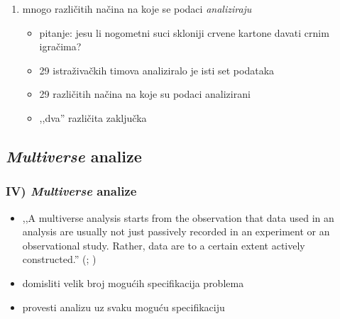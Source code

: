 \documentclass{beamer}
\newcounter{saveenumi}
\newcommand{\conti}{\setcounter{enumi}{\value{saveenumi}}}
\newcommand{\tinycitep}[1]{%
    \bgroup
    \scriptsize
    \citep{#1}
    \egroup}
\begin{document}
\begin{frame}
    \begin{enumerate}
        \conti

        \item mnogo različitih načina na koje se podaci \emph{analiziraju}
            \tinycitep{silberzahnManyAnalystsOne2018}

            \begin{itemize}
                \item pitanje: jesu li nogometni suci skloniji crvene kartone
                    davati crnim igračima?

                \pause

                \item 29 istraživačkih timova analiziralo je isti set
                    podataka

                \pause

                \item 29 različitih načina na koje su podaci analizirani

                \pause

                \item ,,dva'' različita zaključka
            \end{itemize}

    \end{enumerate}
\end{frame}

\subsection{\textit{Multiverse} analize}

\begin{frame}
    \frametitle{IV) \textit{Multiverse} analize}

    \begin{itemize}
        \item ,,A multiverse analysis starts from the observation that data used
            in an analysis are usually not just passively recorded in an
            experiment or an observational study.  Rather, data are to a certain
            extent actively constructed.''
            \bgroup
            \scriptsize
            (\citealp*[str. 702]{steegenIncreasingTransparencyMultiverse2016};
            \citealp*[za sličan pristup
            vidi][]{simonsohnSpecificationCurveDescriptive2015})
            \egroup

        \pause

        \item domisliti velik broj mogućih specifikacija problema

        \item provesti analizu uz svaku moguću specifikaciju

    \end{itemize}

\end{frame}
\end{document}
